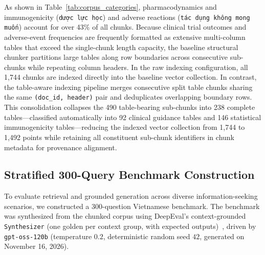 \documentclass[sn-mathphys, oneside]{sn-jnl}
\newcommand{\vntt}[1]{{\fontencoding{T5}\selectfont\texttt{#1}}}
\newcommand{\artifact}[1]{\nolinkurl{#1}}
\begin{document}
As shown in Table~\ref{tab:corpus_categories}, pharmacodynamics and immunogenicity (\vntt{dược lực học}) and adverse reactions (\vntt{tác dụng không mong muốn}) account for over 43\% of all chunks. Because clinical trial outcomes and adverse-event frequencies are frequently formatted as extensive multi-column tables that exceed the single-chunk length capacity, the baseline structural chunker partitions large tables along row boundaries across consecutive sub-chunks while repeating column headers. In the raw indexing configuration, all 1,744 chunks are indexed directly into the baseline vector collection. In contrast, the table-aware indexing pipeline merges consecutive split table chunks sharing the same \texttt{(doc\_id, header)} pair and deduplicates overlapping boundary rows. This consolidation collapses the 490 table-bearing sub-chunks into 238 complete tables—classified automatically into 92 clinical guidance tables and 146 statistical immunogenicity tables—reducing the indexed vector collection from 1,744 to 1,492 points while retaining all constituent sub-chunk identifiers in chunk metadata for provenance alignment.

\subsection{Stratified 300-Query Benchmark Construction}
\label{subsec:benchmark_construction}
To evaluate retrieval and grounded generation across diverse information-seeking scenarios, we constructed a 300-question Vietnamese benchmark. The benchmark was synthesized from the chunked corpus using DeepEval's context-grounded \artifact{Synthesizer} (one golden per context group, with expected outputs)~\cite{deepevalcontexts}, driven by \artifact{gpt-oss-120b} (temperature $0.2$, deterministic random seed $42$, generated on November 16, 2026).
\end{document}
